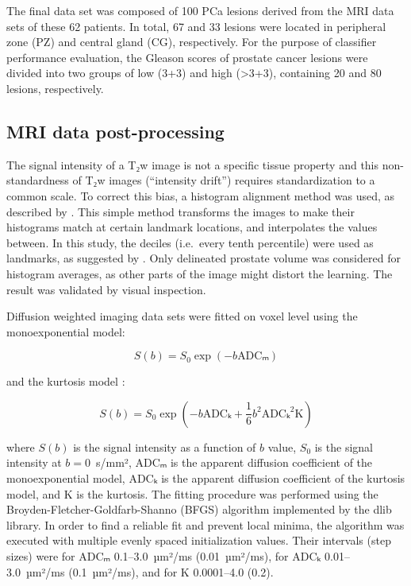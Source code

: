 The final data set was composed of 100 PCa lesions derived from the MRI data
sets of these 62 patients. In total, 67 and 33 lesions were located in
peripheral zone (PZ) and central gland (CG), respectively. For the purpose of
classifier performance evaluation, the Gleason scores of prostate cancer lesions
were divided into two groups of low (3+3) and high (>3+3), containing 20 and 80
lesions, respectively.


\subsection{MRI data post-processing}

The signal intensity of a T₂w image is not a specific tissue property and
this non-standardness of T₂w images (``intensity drift'') requires
standardization to a common scale. To correct this bias, a histogram alignment
method was used, as described by \citet{Nyul1999,Nyul2000}. This simple method
transforms the images to make their histograms match at certain landmark
locations,  and interpolates the values between. In this study, the deciles
(i.e.\ every tenth percentile) were used as landmarks, as suggested by
\citet{Nyul1999}. Only delineated prostate volume was considered for histogram
averages, as other parts of the image might distort the learning. The result was
validated by visual inspection.

Diffusion weighted imaging data sets were fitted on voxel level using the
monoexponential model:

\begin{equation}
  S(b) = S_0 \exp(-b \text{ADCₘ})
\end{equation}

and the kurtosis model \citep{Jensen2005}:

\begin{equation}
  S(b) = S_0 \exp\left(
    -b \text{ADCₖ} + \frac{1}{6} b^2 \text{ADCₖ}^2 \text{K}
  \right)
\end{equation}

where $S(b)$ is the signal intensity as a function of $b$ value, $S_0$ is the
signal intensity at $b=0$~s/mm², ADCₘ is the apparent diffusion coefficient
of the monoexponential model, ADCₖ is the apparent diffusion coefficient of
the kurtosis model, and K is the kurtosis. The fitting procedure was performed
using the Broyden-Fletcher-Goldfarb-Shanno (BFGS) algorithm \citep{Shanno1985}
implemented by the dlib \citep{King2009} library. In order to find a reliable
fit and prevent local minima, the algorithm was executed with multiple evenly
spaced initialization values. Their intervals (step sizes) were for ADCₘ
0.1--3.0~µm²/ms (0.01~µm²/ms), for ADCₖ 0.01--3.0~µm²/ms (0.1~µm²/ms), and
for K 0.0001--4.0 (0.2).

